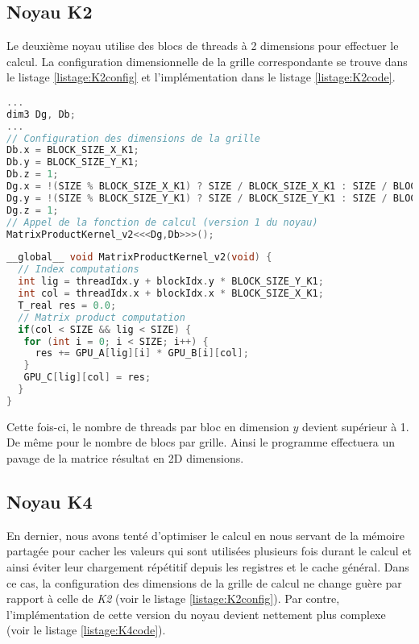 \documentclass[11pt, twocolumn]{article}
\begin{document}
\subsection{Noyau K2}

Le deuxième noyau utilise des blocs de threads à 2 dimensions pour effectuer le calcul. La configuration dimensionnelle de la grille correspondante se trouve dans le listage \ref{listage:K2config} et l'implémentation dans le listage \ref{listage:K2code}. 

\begin{lstlisting}[language=C, morekeywords={dim3}, label={listage:K2config}, caption={Configuration des dimensions de la grille de calcul pour \textit{K2}}]
...
dim3 Dg, Db;
...
// Configuration des dimensions de la grille
Db.x = BLOCK_SIZE_X_K1;
Db.y = BLOCK_SIZE_Y_K1;
Db.z = 1;
Dg.x = !(SIZE % BLOCK_SIZE_X_K1) ? SIZE / BLOCK_SIZE_X_K1 : SIZE / BLOCK_SIZE_X_K1 + 1;
Dg.y = !(SIZE % BLOCK_SIZE_Y_K1) ? SIZE / BLOCK_SIZE_Y_K1 : SIZE / BLOCK_SIZE_Y_K1 + 1;
Dg.z = 1;
// Appel de la fonction de calcul (version 1 du noyau)
MatrixProductKernel_v2<<<Dg,Db>>>();
\end{lstlisting}

\begin{lstlisting}[language=C, morekeywords={__global__}, label={listage:K2code}, caption={Implémentation du noyau \textit{K2}}]
__global__ void MatrixProductKernel_v2(void) {
  // Index computations
  int lig = threadIdx.y + blockIdx.y * BLOCK_SIZE_Y_K1;
  int col = threadIdx.x + blockIdx.x * BLOCK_SIZE_X_K1;
  T_real res = 0.0;
  // Matrix product computation
  if(col < SIZE && lig < SIZE) {
   for (int i = 0; i < SIZE; i++) {
     res += GPU_A[lig][i] * GPU_B[i][col];
   }
   GPU_C[lig][col] = res;
  }
}
\end{lstlisting}

Cette fois-ci, le nombre de threads par bloc en dimension $y$ devient supérieur à 1. De même pour le nombre de blocs par grille. Ainsi le programme effectuera un pavage de la matrice résultat en 2D dimensions.

\subsection{Noyau K4}

En dernier, nous avons tenté d'optimiser le calcul en nous servant de la mémoire partagée pour cacher les valeurs qui sont utilisées plusieurs fois durant le calcul et ainsi éviter leur chargement répétitif depuis les registres et le cache général. Dans ce cas, la configuration des dimensions de la grille de calcul ne change guère par rapport à celle de \textit{K2} (voir le listage \ref{listage:K2config}). Par contre, l'implémentation de cette version du noyau devient nettement plus complexe (voir le listage \ref{listage:K4code}).
\end{document}
